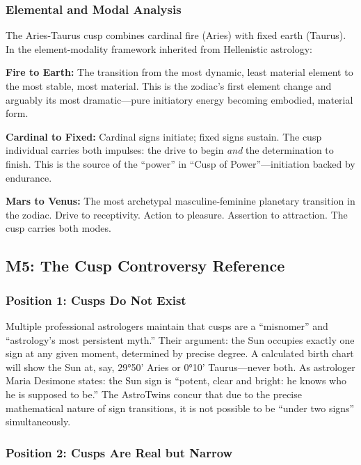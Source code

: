 \documentclass[11pt,letterpaper]{article}
\begin{document}
\subsubsection{Elemental and Modal Analysis}

The Aries-Taurus cusp combines cardinal fire (Aries) with fixed earth (Taurus). In the element-modality framework inherited from Hellenistic astrology:

\textbf{Fire to Earth:} The transition from the most dynamic, least material element to the most stable, most material. This is the zodiac's first element change and arguably its most dramatic---pure initiatory energy becoming embodied, material form.

\textbf{Cardinal to Fixed:} Cardinal signs initiate; fixed signs sustain. The cusp individual carries both impulses: the drive to begin \textit{and} the determination to finish. This is the source of the ``power'' in ``Cusp of Power''---initiation backed by endurance.

\textbf{Mars to Venus:} The most archetypal masculine-feminine planetary transition in the zodiac. Drive to receptivity. Action to pleasure. Assertion to attraction. The cusp carries both modes.

\subsection{M5: The Cusp Controversy Reference}

\subsubsection{Position 1: Cusps Do Not Exist}

Multiple professional astrologers maintain that cusps are a ``misnomer'' and ``astrology's most persistent myth.'' Their argument: the Sun occupies exactly one sign at any given moment, determined by precise degree. A calculated birth chart will show the Sun at, say, 29°50' Aries or 0°10' Taurus---never both. As astrologer Maria Desimone states: the Sun sign is ``potent, clear and bright: he knows who he is supposed to be.'' The AstroTwins concur that due to the precise mathematical nature of sign transitions, it is not possible to be ``under two signs'' simultaneously.

\subsubsection{Position 2: Cusps Are Real but Narrow}
\end{document}

